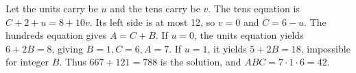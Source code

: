 Let the units carry be $u$ and the tens carry be $v$. The tens equation is $C+2+u=8+10v$. Its left side is at most 12, so $v=0$ and $C=6-u$. The hundreds equation gives $A=C+B$. If $u=0$, the units equation yields $6+2B=8$, giving $B=1,C=6,A=7$. If $u=1$, it yields $5+2B=18$, impossible for integer $B$. Thus $667+121=788$ is the solution, and $ABC=7\cdot1\cdot6=\boxed{42}$.
